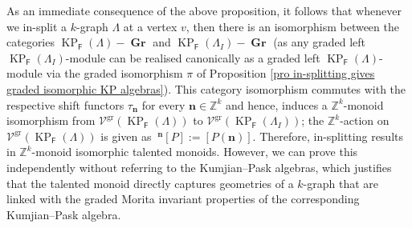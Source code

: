 \documentclass[12pt]{amsart}
\newcommand{\N}{\mathbf{n}}
\newcommand{\KP}{\operatorname{KP}}
\theoremstyle{definition}
\theoremstyle{remark}
\newcommand{\gr}{\operatorname{gr}}
\newcommand{\Gr}{\operatorname{\textbf{Gr}}}
\begin{document}
As an immediate consequence of the above proposition, it follows that whenever we in-split a $k$-graph $\Lambda$ at a vertex $v$, then there is an isomorphism between the categories $\KP_\mathsf{F}(\Lambda)-\Gr$ and $\KP_\mathsf{F}(\Lambda_I)-\Gr$ (as any graded left $\KP_\mathsf{F}(\Lambda_I)$-module can be realised canonically as a graded left $\KP_\mathsf{F}(\Lambda)$-module via the graded isomorphism $\pi$ of Proposition \ref{pro in-splitting gives graded isomorphic KP algebras}). This category isomorphism commutes with the respective shift functors $\tau_\N$ for every $\N\in \mathbb{Z}^k$ and hence, induces a $\mathbb{Z}^k$-monoid isomorphism from $\mathcal{V}^{\gr}(\KP_\mathsf{F}(\Lambda))$ to $\mathcal{V}^{\gr}(\KP_\mathsf{F}(\Lambda_I))$; the $\mathbb{Z}^k$-action on $\mathcal{V}^{\gr}(\KP_\mathsf{F}(\Lambda))$ is given as $~^\N [P]:=[P(\N)]$. Therefore, in-splitting results in $\mathbb{Z}^k$-monoid isomorphic talented monoids. However, we can prove this independently without referring to the Kumjian--Pask algebras, which justifies that the talented monoid directly captures geometries of a $k$-graph that are linked with the graded Morita invariant properties of the corresponding Kumjian--Pask algebra. 
\end{document}
